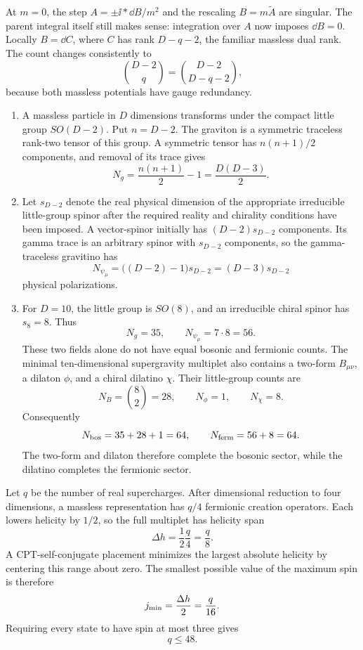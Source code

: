 \begin{enumerate}
\begin{enumerate}
      At \(m=0\), the step \(A=\pm \ii*\dd B/m^2\) and the rescaling
      \(B=m\widetilde A\) are singular.  The parent integral itself still
      makes sense: integration over \(A\) now imposes \(\dd B=0\).  Locally
      \(B=\dd C\), where \(C\) has rank \(D-q-2\), the familiar massless
      dual rank.  The count changes consistently to
      \[
        \binom{D-2}{q}
          =\binom{D-2}{D-q-2},
      \]
      because both massless potentials have gauge redundancy.
  \end{enumerate}

  \begin{enumerate}
    \item A massless particle in \(D\) dimensions transforms under the
      compact little group \(SO(D-2)\).  Put \(n=D-2\).  The graviton is a
      symmetric traceless rank-two tensor of this group.  A symmetric
      tensor has \(n(n+1)/2\) components, and removal of its trace gives
      \[
        N_g=\frac{n(n+1)}2-1
          =\boxed{\frac{D(D-3)}2}.
      \]
    \item Let \(s_{D-2}\) denote the real physical dimension of the
      appropriate irreducible little-group spinor after the required
      reality and chirality conditions have been imposed.  A vector-spinor
      initially has \((D-2)s_{D-2}\) components.  Its gamma trace is an
      arbitrary spinor with \(s_{D-2}\) components, so the gamma-traceless
      gravitino has
      \[
        N_{\psi_\mu}
          =\bigl((D-2)-1\bigr)s_{D-2}
          =\boxed{(D-3)s_{D-2}}
      \]
      physical polarizations.
    \item For \(D=10\), the little group is \(SO(8)\), and an irreducible
      chiral spinor has \(s_8=8\).  Thus
      \[
        N_g=35,\qquad N_{\psi_\mu}=7\cdot8=56.
      \]
      These two fields alone do not have equal bosonic and fermionic
      counts.  The minimal ten-dimensional supergravity multiplet also
      contains a two-form \(B_{\mu\nu}\), a dilaton \(\phi\), and a
      chiral dilatino \(\chi\).  Their little-group counts are
      \[
        N_B=\binom82=28,\qquad N_\phi=1,\qquad N_\chi=8.
      \]
      Consequently
      \[
        N_{\rm bos}=35+28+1=64,
        \qquad
        N_{\rm ferm}=56+8=64.
      \]
      The two-form and dilaton therefore complete the bosonic sector,
      while the dilatino completes the fermionic sector.
  \end{enumerate}

Let \(q\) be the number of real supercharges.  After dimensional
  reduction to four dimensions, a massless representation has \(q/4\)
  fermionic creation operators.  Each lowers helicity by \(1/2\), so the
  full multiplet has helicity span
  \[
    \Delta h=\frac12\frac q4=\frac q8.
  \]
  A CPT-self-conjugate placement minimizes the largest absolute
  helicity by centering this range about zero.  The smallest possible
  value of the maximum spin is therefore
  \[
    j_{\rm min}=\frac{\Delta h}{2}=\frac q{16}.
  \]
  Requiring every state to have spin at most three gives
  \[
    q\leq48.
  \]


\end{enumerate}
